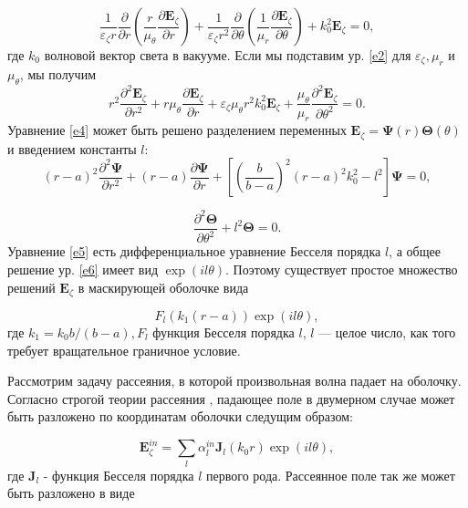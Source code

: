 \documentclass[a4paper, 12pt]{article}
\begin{document}
\begin{equation}\label{e3}
	\frac{1}{\varepsilon_\zeta r} \frac{\partial}{\partial r}(\frac{r}{\mu_\theta}\frac{\partial \textbf{E}_\zeta}
	{\partial r}) +
	\frac{1}{\varepsilon_\zeta r^2} \frac{\partial}{\partial \theta}(\frac{1}{\mu_r}\frac{\partial \textbf{E}_\zeta}
	{\partial \theta}) + k_0^2 \textbf{E}_\zeta = 0,
\end{equation}
где $k_0$ волновой вектор света в вакууме. Если мы подставим ур. \eqref{e2} для $\varepsilon_\zeta, \mu_r$ и 
$\mu_\theta$, мы получим
\begin{equation}\label{e4}
	r^2 \frac{\partial^2 \textbf{E}_\zeta}{\partial r^2} + r\mu_\theta \frac{\partial \textbf{E}_\zeta}{\partial r} + 
	\varepsilon_\zeta \mu_\theta r^2 k_0^2 \textbf{E}_\zeta + \frac{\mu_\theta}{\mu_r} \frac{\partial^2 
	\textbf{E}_\zeta}{\partial \theta^2} = 0.
\end{equation}
Уравнение \eqref{e4} может быть решено разделением переменных
$ \textbf{E}_\zeta = \mathbf{\Psi}(r) \mathbf{\Theta}(\theta)$ и введением константы $l$:
\begin{equation}\label{e5}
	(r-a)^2 \frac{\partial^2 \mathbf{\Psi}}{\partial r^2} + (r-a) \frac{\partial \mathbf{\Psi}}{\partial r} +
	\left[ (\frac{b}{b-a})^2(r-a)^2 k_0^2-l^2\right] \mathbf{\Psi} = 0,
\end{equation}

\begin{equation}\label{e6}
	\frac{\partial^2 \mathbf{\Theta}}{\partial \theta^2} + l^2 \mathbf{\Theta} = 0.
\end{equation}
Уравнение \eqref{e5} есть дифференциальное уравнение Бесселя порядка $l$, а общее решение ур. \eqref{e6} имеет вид
$\exp(il\theta)$. Поэтому существует простое множество решений $\mathbf{E}_\zeta$ в маскирующей оболочке вида

\begin{equation}\label{e7}
	F_l(k_1(r-a))\exp(il\theta),
\end{equation}
где $k_1 = k_0 b/(b-a), F_l$ функция Бесселя порядка $l$, $l$ --- целое число, как того требует вращательное граничное 
условие.

Рассмотрим задачу рассеяния, в которой произвольная волна падает на оболочку. Согласно строгой теории рассеяния 
\cite{12}, падающее поле в двумерном случае может быть разложено по координатам оболочки следущим образом:

\begin{equation}\label{e8}
	\mathbf{E}_\zeta^{in} = \sum\limits_l \alpha_l^{in} \mathbf{J}_l(k_0 r)\exp(il\theta),
\end{equation}
где $\mathbf{J}_l$ -  функция Бесселя порядка $l$ первого рода. Рассеянное поле так же может быть разложено в виде
\end{document}
